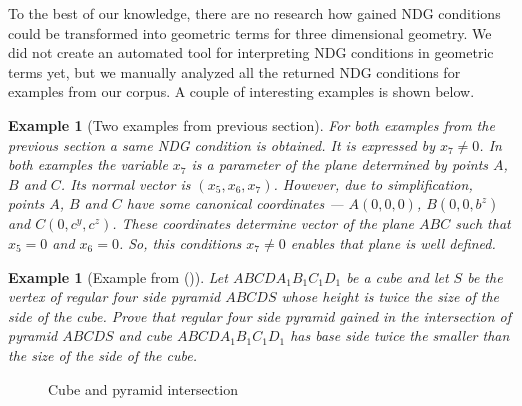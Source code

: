 \documentclass[final,1p,times,authoryear]{elsarticle}
\newtheorem{example}[theorem]{Example}
\begin{document}
To the best of our knowledge, there are no research how gained NDG
conditions could be transformed into geometric terms for three
dimensional geometry. We did not create an automated tool for
interpreting NDG conditions in geometric terms yet, but we manually
analyzed all the returned NDG conditions for examples from our
corpus. A couple of interesting examples is shown below.

\begin{example}[Two examples from previous section]
  For both examples from the previous section a same NDG condition is
  obtained. It is expressed by $x_7 \neq 0$. In both examples the
  variable $x_7$ is a parameter of the plane determined by points $A$,
  $B$ and $C$. Its normal vector is $(x_5, x_6, x_7)$. However, due to
  simplification, points $A$, $B$ and $C$ have some canonical
  coordinates --- $A(0, 0, 0)$, $B(0, 0, b^z)$ and $C(0, c^y, c^z)$.
  These coordinates determine vector of the plane $ABC$ such that
  $x_5 = 0$ and $x_6 = 0$. So, this conditions $x_7 \neq 0$ enables
  that plane is well defined.
\end{example}

\begin{example}[Example from (\cite{arhzbirka})] 
\label{ex:kockapiramida}
Let $ABCDA_1B_1C_1D_1$ be a cube and let $S$ be the vertex of regular
four side pyramid $ABCDS$ whose height is twice the size of the side
of the cube. Prove that regular four side pyramid gained in the
intersection of pyramid $ABCDS$ and cube $ABCDA_1B_1C_1D_1$ has base
side twice the smaller than the size of the side of the cube.
\end{example}

\begin{figure}[!h]
\begin{center}

\end{center}
\caption{Cube and pyramid intersection}
\end{figure}
\end{document}
